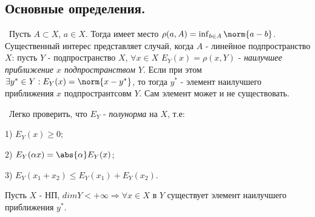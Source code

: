 \subsection*{Основные определения.}
\noindent \textasteriskcentered~Пусть $A \subset X$, $a \in X$. Тогда имеет место $\rho(a , A) = \inf_{b \in A} \norm{a - b}$. Существенный интерес представляет случай, 
когда $A$ - линейное подпространство $X$: пусть $Y$ - подпространство $X$, $\forall x \in X$ $E_Y(x) = \rho(x, Y)$ - \textit{наилучшее приближение $x$ подпространством
$Y$}. Если при этом $\exists y^* \in Y : E_Y(x) = \norm{x - y^*}$, то тогда $y^*$ - элемент наилучшего приближения $x$ подпространтсовм $Y$. Сам элемент может и не существовать.

\smallskip
\noindent \textasteriskcentered~Легко проверить, что $E_Y$ - \textit{полунорма} на $X$, т.е:

1) $E_Y(x) \ge 0$;

2) $E_Y(\alpha x) = \abs{\alpha} E_Y(x)$;

3) $E_Y(x_1 + x_2) \le E_Y(x_1) + E_Y(x_2)$.

\begin{theorem*}[Борель]
   Пусть $X$ - НП, $dim Y < + \infty \Rightarrow  \forall x \in X$ в $Y$ существует элемент наилучшего приближения $y^*$. 
\end{theorem*}

